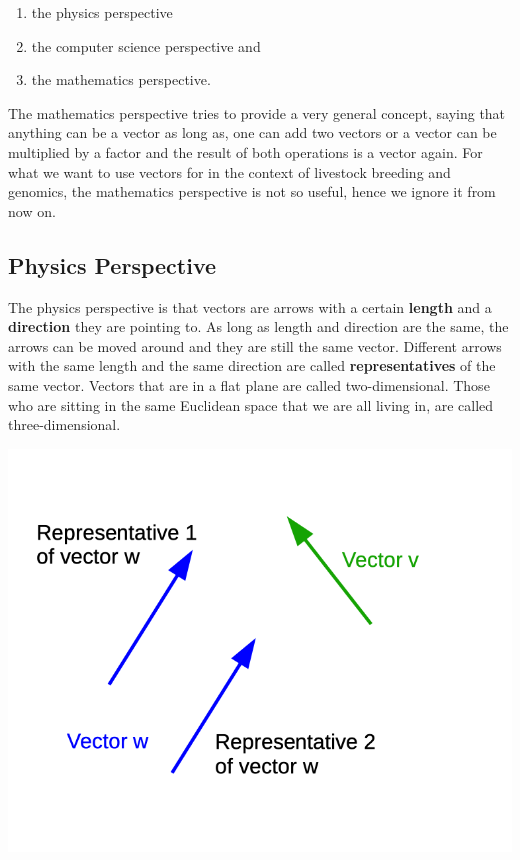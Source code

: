 \documentclass[
]{book}
\providecommand{\tightlist}{%
  \setlength{\itemsep}{0pt}\setlength{\parskip}{0pt}}
\theoremstyle{definition}
\theoremstyle{definition}
\theoremstyle{definition}
\theoremstyle{remark}
\begin{document}
\begin{enumerate}
\def\labelenumi{\arabic{enumi}.}
\tightlist
\item
  the physics perspective
\item
  the computer science perspective and
\item
  the mathematics perspective.
\end{enumerate}

The mathematics perspective tries to provide a very general concept, saying that anything can be a vector as long as, one can add two vectors or a vector can be multiplied by a factor and the result of both operations is a vector again. For what we want to use vectors for in the context of livestock breeding and genomics, the mathematics perspective is not so useful, hence we ignore it from now on.

\hypertarget{intro-linalg-physics-perspective}{%
\subsection{Physics Perspective}\label{intro-linalg-physics-perspective}}

The physics perspective is that vectors are arrows with a certain \textbf{length} and a \textbf{direction} they are pointing to. As long as length and direction are the same, the arrows can be moved around and they are still the same vector. Different arrows with the same length and the same direction are called \textbf{representatives} of the same vector. Vectors that are in a flat plane are called two-dimensional. Those who are sitting in the same Euclidean space that we are all living in, are called three-dimensional.

\includegraphics[width=10.58in]{odg/vector-physics-perspective}
\end{document}
